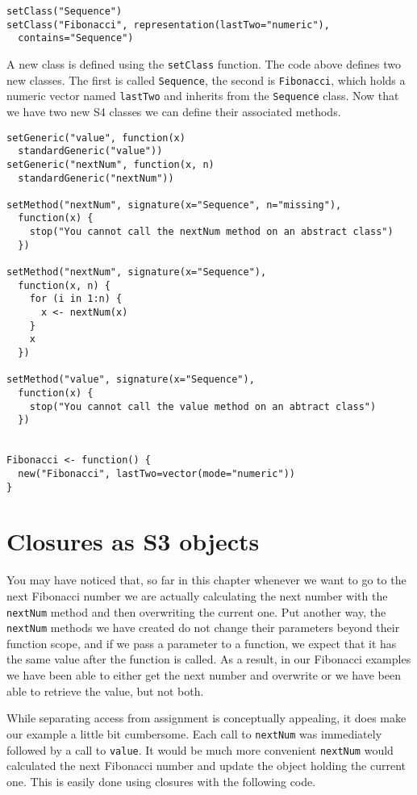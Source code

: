 \begin{verbatim}
setClass("Sequence")
setClass("Fibonacci", representation(lastTwo="numeric"),
  contains="Sequence")
\end{verbatim}

A new class is defined using the \texttt{setClass} function. The code
above defines two new classes. The first is called \texttt{Sequence},
the second is \texttt{Fibonacci}, which holds a numeric vector named
\texttt{lastTwo} and inherits from the \texttt{Sequence} class. Now that
we have two new S4 classes we can define their associated methods.

\begin{verbatim}
setGeneric("value", function(x)
  standardGeneric("value"))
setGeneric("nextNum", function(x, n)
  standardGeneric("nextNum"))

setMethod("nextNum", signature(x="Sequence", n="missing"),
  function(x) {
    stop("You cannot call the nextNum method on an abstract class")
  })

setMethod("nextNum", signature(x="Sequence"),
  function(x, n) {
    for (i in 1:n) {
      x <- nextNum(x)
    }
    x
  })

setMethod("value", signature(x="Sequence"),
  function(x) {
    stop("You cannot call the value method on an abtract class")
  })
  

Fibonacci <- function() {
  new("Fibonacci", lastTwo=vector(mode="numeric"))
}
\end{verbatim}

\hypertarget{closures-as-s3-objects}{%
\section{Closures as S3 objects}\label{closures-as-s3-objects}}

You may have noticed that, so far in this chapter whenever we want to go
to the next Fibonacci number we are actually calculating the next number
with the \texttt{nextNum} method and then overwriting the current one.
Put another way, the \texttt{nextNum} methods we have created do not
change their parameters beyond their function scope, and if we pass a
parameter to a function, we expect that it has the same value after the
function is called. As a result, in our Fibonacci examples we have been
able to either get the next number and overwrite or we have been able to
retrieve the value, but not both.

While separating access from assignment is conceptually appealing, it
does make our example a little bit cumbersome. Each call to
\texttt{nextNum} was immediately followed by a call to \texttt{value}.
It would be much more convenient \texttt{nextNum} would calculated the
next Fibonacci number and update the object holding the current one.
This is easily done using closures with the following code.

